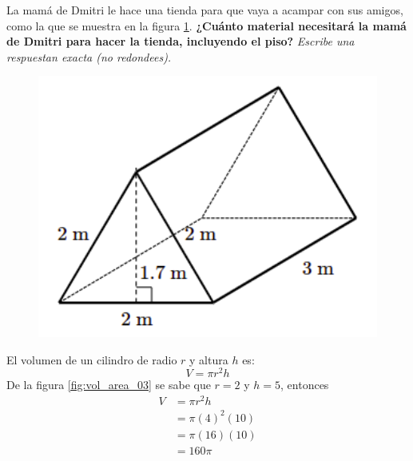 \question[10] La mamá de Dmitri le hace una tienda para que vaya a acampar con sus amigos,
como la que se muestra en la figura \ref{fig:prob_verb_superficie_03}.
\textbf{¿Cuánto material necesitará la mamá de Dmitri para hacer la tienda, incluyendo el piso?}
\textit{Escribe una respuestan exacta (no redondees).}

\begin{minipage}{0.3\linewidth}
    \begin{figure}[H]
        \begin{center}
            \includegraphics[width=1\textwidth]{../images/prob_verb_superficie_03}
        \end{center}
        \caption{}
        \label{fig:prob_verb_superficie_03}
    \end{figure}
\end{minipage}
\begin{minipage}{0.7\linewidth}
    \begin{solutionbox}{6cm}
        El volumen de un cilindro de radio $r$ y altura $h$ es:
        \begin{equation*}
            V = \pi r^2 h
        \end{equation*}
        De la figura \ref{fig:vol_area_03} se sabe que $r=2$ y $h=5$, entonces
        \begin{equation*}
            \begin{split}
                V & = \pi r^2 h\\
                & = \pi (4)^2 (10)\\
                & = \pi (16) (10)\\
                & = 160\pi
            \end{split}
        \end{equation*}
    \end{solutionbox}
\end{minipage}